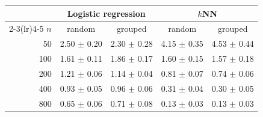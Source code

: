 \begin{tabular}{rcccc}
\toprule
 & \multicolumn{2}{c}{Logistic regression} & \multicolumn{2}{c}{$k$NN} \\
\cmidrule(lr){2-3}\cmidrule(lr){4-5}
$n$ & random & grouped & random & grouped \\
\midrule
50 & 2.50 $\pm$ 0.20 & 2.30 $\pm$ 0.28 & 4.15 $\pm$ 0.35 & 4.53 $\pm$ 0.44 \\
100 & 1.61 $\pm$ 0.11 & 1.86 $\pm$ 0.17 & 1.60 $\pm$ 0.15 & 1.57 $\pm$ 0.18 \\
200 & 1.21 $\pm$ 0.06 & 1.14 $\pm$ 0.04 & 0.81 $\pm$ 0.07 & 0.74 $\pm$ 0.06 \\
400 & 0.93 $\pm$ 0.05 & 0.96 $\pm$ 0.06 & 0.31 $\pm$ 0.04 & 0.30 $\pm$ 0.05 \\
800 & 0.65 $\pm$ 0.06 & 0.71 $\pm$ 0.08 & 0.13 $\pm$ 0.03 & 0.13 $\pm$ 0.03 \\
\bottomrule
\end{tabular}
